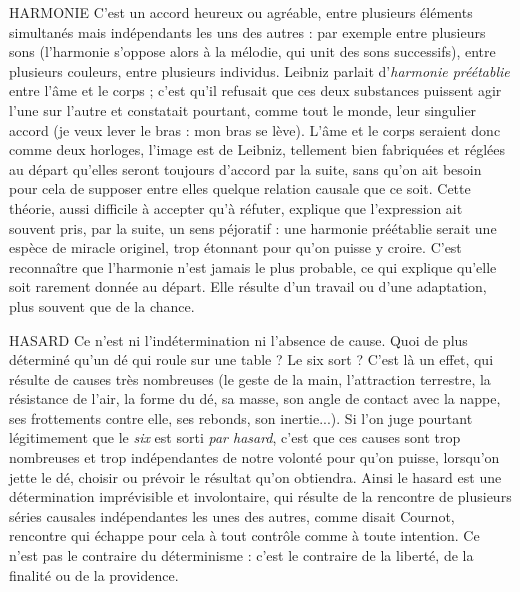 HARMONIE C'est un accord heureux ou agréable, entre plusieurs éléments
simultanés mais indépendants les uns des autres : par exemple
entre plusieurs sons (l'harmonie s’oppose alors à la mélodie, qui unit des sons
successifs), entre plusieurs couleurs, entre plusieurs individus. Leibniz parlait
d'{\it harmonie préétablie} entre l'âme et le corps ; c’est qu’il refusait que ces deux
substances puissent agir l’une sur l’autre et constatait pourtant, comme tout le
monde, leur singulier accord (je veux lever le bras : mon bras se lève). L'âme
et le corps seraient donc comme deux horloges, l’image est de Leibniz, tellement
bien fabriquées et réglées au départ qu’elles seront toujours d’accord par
la suite, sans qu’on ait besoin pour cela de supposer entre elles quelque relation
causale que ce soit. Cette théorie, aussi difficile à accepter qu’à réfuter, explique
que l'expression ait souvent pris, par la suite, un sens péjoratif : une harmonie
préétablie serait une espèce de miracle originel, trop étonnant pour qu’on
puisse y croire. C’est reconnaître que l’harmonie n’est jamais le plus probable,
ce qui explique qu’elle soit rarement donnée au départ. Elle résulte d’un travail
ou d’une adaptation, plus souvent que de la chance.

HASARD Ce n’est ni l’indétermination ni l'absence de cause. Quoi de plus
déterminé qu’un dé qui roule sur une table ? Le six sort ? C’est là
un effet, qui résulte de causes très nombreuses (le geste de la main, l'attraction
terrestre, la résistance de l'air, la forme du dé, sa masse, son angle de contact
avec la nappe, ses frottements contre elle, ses rebonds, son inertie...). Si l'on
juge pourtant légitimement que le {\it six} est sorti {\it par hasard}, c’est que ces causes
sont trop nombreuses et trop indépendantes de notre volonté pour qu’on
puisse, lorsqu'on jette le dé, choisir ou prévoir le résultat qu’on obtiendra. Ainsi
le hasard est une détermination imprévisible et involontaire, qui résulte de la
rencontre de plusieurs séries causales indépendantes les unes des autres, comme
disait Cournot, rencontre qui échappe pour cela à tout contrôle comme à toute
intention. Ce n’est pas le contraire du déterminisme : c’est le contraire de la
liberté, de la finalité ou de la providence.


